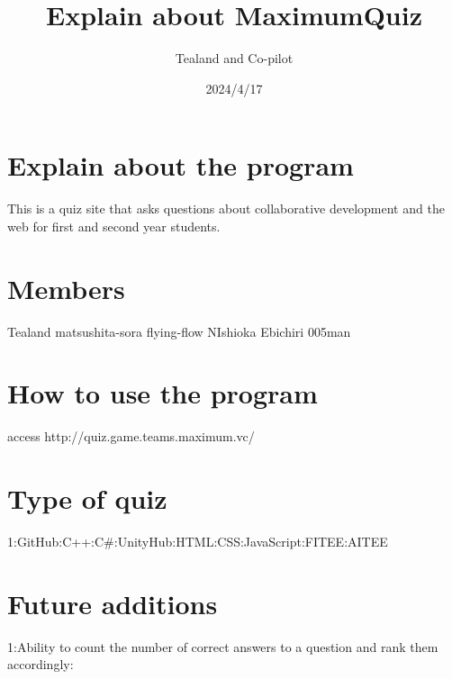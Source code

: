 \documentclass{article}%
\title{Explain about MaximumQuiz}  %
\author{Tealand and Co-pilot}
\date{2024/4/17}
\begin{document}
\maketitle

\section{Explain about the program}

This is a quiz site that asks questions about collaborative development and the web for first and second year students.


\section{Members}

Tealand\newline
matsushita-sora\newline
flying-flow\newline
NIshioka\newline
Ebichiri\newline
005man\newline

\section{How to use the program}

access http://quiz.game.teams.maximum.vc/

\section{Type of quiz}

1:GitHub:C++:C#:UnityHub:HTML:CSS:JavaScript:FITEE:AITEE\newline

\section{Future additions}
1:Ability to count the number of correct answers to a question and rank them accordingly:
\end{document}
